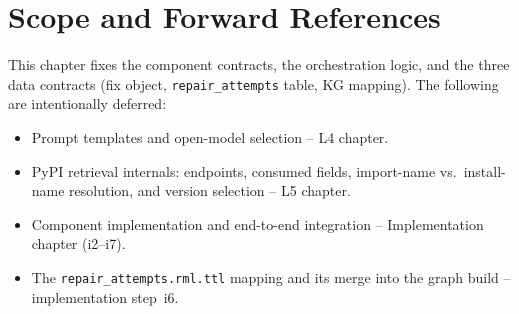 \section{Scope and Forward References}
\label{sec:arch-scope}

This chapter fixes the component contracts, the orchestration logic, and
the three data contracts (fix object, \texttt{repair\_attempts} table, KG
mapping). The following are intentionally deferred:

\begin{itemize}
  \item Prompt templates and open-model selection -- L4 chapter.
  \item PyPI retrieval internals: endpoints, consumed fields, import-name
        vs.\ install-name resolution, and version selection -- L5 chapter.
  \item Component implementation and end-to-end integration -- Implementation
        chapter (i2--i7).
  \item The \texttt{repair\_attempts.rml.ttl} mapping and its merge into the
        graph build -- implementation step~i6.
\end{itemize}
